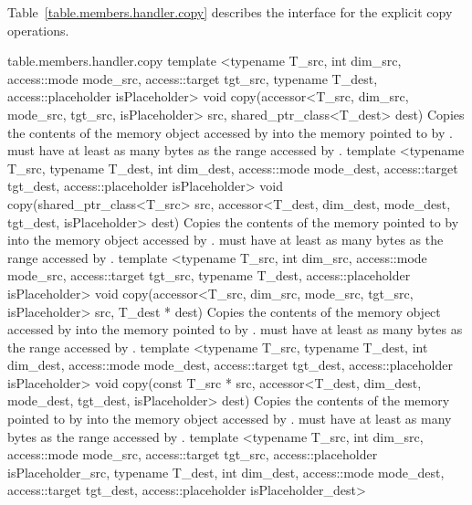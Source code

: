 Table~\ref{table.members.handler.copy} describes the interface for the
explicit copy operations.

{table.members.handler.copy}
  \addRowTwoL
    {template <typename T_src, int dim_src, access::mode mode_src, access::target tgt_src, typename T_dest, access::placeholder isPlaceholder>}
    {void copy(accessor<T_src, dim_src, mode_src, tgt_src, isPlaceholder> src, shared_ptr_class<T_dest> dest)}
    { Copies the contents of the memory object accessed by
       into the memory pointed to by .
       must have at least as many bytes as the
      range accessed by .}
  \addRowTwoL
    {template <typename T_src, typename T_dest, int dim_dest, access::mode mode_dest, access::target tgt_dest, access::placeholder isPlaceholder>}
    {void copy(shared_ptr_class<T_src> src, accessor<T_dest, dim_dest, mode_dest, tgt_dest, isPlaceholder> dest)}
    { Copies the contents of the memory pointed to by 
      into the memory object accessed by .
       must have at least as many bytes as the
      range accessed by .}
  \addRowTwoL
    {template <typename T_src, int dim_src, access::mode mode_src, access::target tgt_src, typename T_dest, access::placeholder isPlaceholder>}
    {void copy(accessor<T_src, dim_src, mode_src, tgt_src, isPlaceholder> src, T_dest * dest)}
    { Copies the contents of the memory object accessed by
       into the memory pointed to by .
       must have at least as many bytes as the
      range accessed by .}
  \addRowTwoL
    {template <typename T_src, typename T_dest, int dim_dest, access::mode mode_dest, access::target tgt_dest, access::placeholder isPlaceholder>}
    {void copy(const T_src * src, accessor<T_dest, dim_dest, mode_dest, tgt_dest, isPlaceholder> dest)}
    { Copies the contents of the memory pointed to by 
      into the memory object accessed by .
       must have at least as many bytes as the
      range accessed by .}
  \addRowTwoL
    {template <typename T_src, int dim_src, access::mode mode_src, access::target tgt_src, access::placeholder isPlaceholder_src, typename T_dest, int dim_dest, access::mode mode_dest, access::target tgt_dest, access::placeholder isPlaceholder_dest>}
